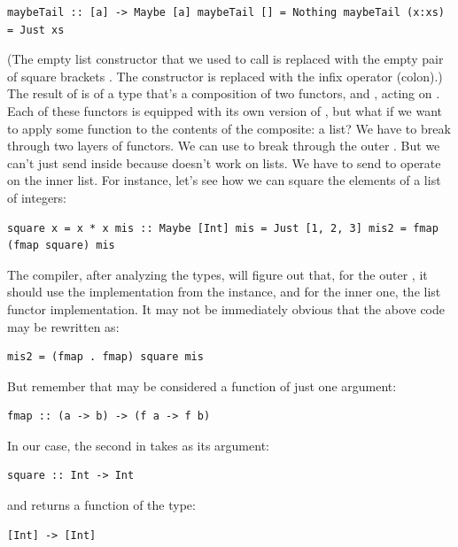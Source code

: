 \begin{verbatim}
maybeTail :: [a] -> Maybe [a] maybeTail [] = Nothing maybeTail (x:xs) = Just xs
\end{verbatim}

(The empty list constructor that we used to call  is
replaced with the empty pair of square brackets \code{{[}{]}}. The
 constructor is replaced with the infix operator \code{:}
(colon).) The result of  is of a type that's a
composition of two functors,  and \code{{[}{]}}, acting
on . Each of these functors is equipped with its own version
of , but what if we want to apply some function 
to the contents of the composite: a  list? We have to
break through two layers of functors. We can use  to break
through the outer . But we can't just send 
inside  because  doesn't work on lists. We have
to send  to operate on the inner list. For instance,
let's see how we can square the elements of a  list of
integers:

\begin{verbatim}
square x = x * x mis :: Maybe [Int] mis = Just [1, 2, 3] mis2 = fmap (fmap square) mis
\end{verbatim}

The compiler, after analyzing the types, will figure out that, for the
outer , it should use the implementation from the
 instance, and for the inner one, the list functor
implementation. It may not be immediately obvious that the above code
may be rewritten as:

\begin{verbatim}
mis2 = (fmap . fmap) square mis
\end{verbatim}

But remember that  may be considered a function of just one
argument:

\begin{verbatim}
fmap :: (a -> b) -> (f a -> f b)
\end{verbatim}

In our case, the second  in  takes
as its argument:

\begin{verbatim}
square :: Int -> Int
\end{verbatim}

and returns a function of the type:

\begin{verbatim}
[Int] -> [Int]
\end{verbatim}

